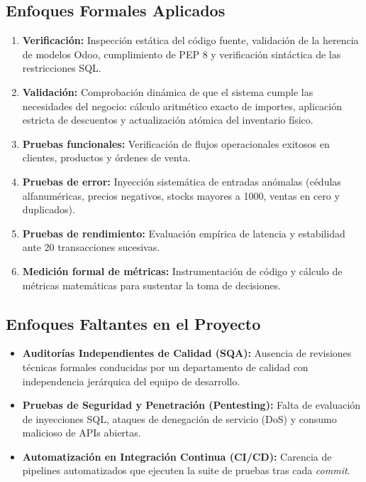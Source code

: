 \documentclass{article}
\begin{document}
\subsection{Enfoques Formales Aplicados}
\begin{enumerate}[leftmargin=*]
\item \textbf{Verificación:} Inspección estática del código fuente, validación de la herencia de modelos Odoo, cumplimiento de PEP 8 y verificación sintáctica de las restricciones SQL.
\item \textbf{Validación:} Comprobación dinámica de que el sistema cumple las necesidades del negocio: cálculo aritmético exacto de importes, aplicación estricta de descuentos y actualización atómica del inventario físico.
\item \textbf{Pruebas funcionales:} Verificación de flujos operacionales exitosos en clientes, productos y órdenes de venta.
\item \textbf{Pruebas de error:} Inyección sistemática de entradas anómalas (cédulas alfanuméricas, precios negativos, stocks mayores a 1000, ventas en cero y duplicados).
\item \textbf{Pruebas de rendimiento:} Evaluación empírica de latencia y estabilidad ante 20 transacciones sucesivas.
\item \textbf{Medición formal de métricas:} Instrumentación de código y cálculo de métricas matemáticas para sustentar la toma de decisiones.
\end{enumerate}

\subsection{Enfoques Faltantes en el Proyecto}
\begin{itemize}[leftmargin=*]
\item \textbf{Auditorías Independientes de Calidad (SQA):} Ausencia de revisiones técnicas formales conducidas por un departamento de calidad con independencia jerárquica del equipo de desarrollo.
\item \textbf{Pruebas de Seguridad y Penetración (Pentesting):} Falta de evaluación de inyecciones SQL, ataques de denegación de servicio (DoS) y consumo malicioso de APIs abiertas.
\item \textbf{Automatización en Integración Continua (CI/CD):} Carencia de pipelines automatizados que ejecuten la suite de pruebas tras cada \textit{commit}.
\end{itemize}
\end{document}
